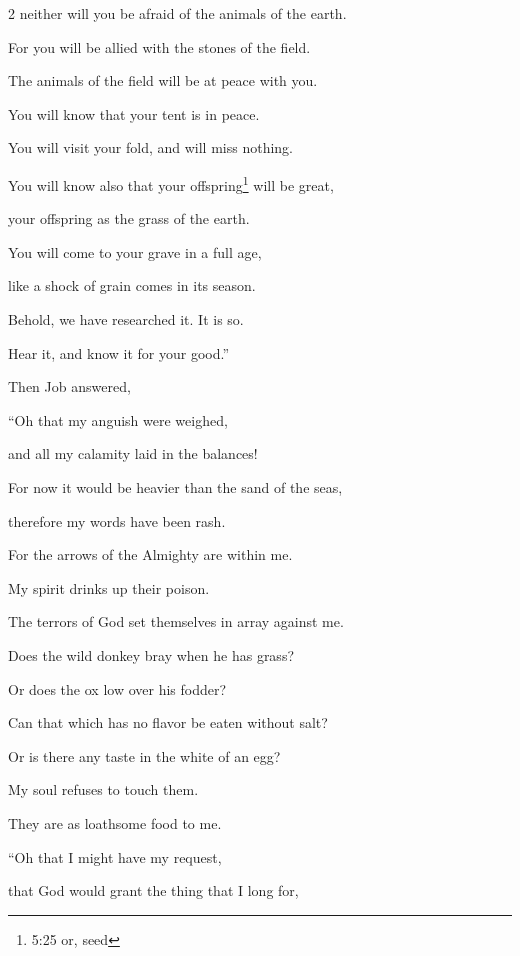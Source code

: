\begin{multicols}{2}
	neither will you be afraid of the animals of the earth.
	
	\myverse{}For you will be allied with the stones of the field.
	
	The animals of the field will be at peace with you.
	
	\myverse{}You will know that your tent is in peace.
	
	You will visit your fold, and will miss nothing.
	
	\myverse{}You will know also that your offspring\footnote{5:25 or, seed} will be great,
	
	your offspring as the grass of the earth.
	
	\myverse{}You will come to your grave in a full age,
	
	like a shock of grain comes in its season.
	
	\myverse{}Behold, we have researched it. It is so.
	
	Hear it, and know it for your good.”
	
	
	\mychapter{} \myverse*{}Then Job answered,
	
	\myverse{}“Oh that my anguish were weighed,
	
	and all my calamity laid in the balances!
	
	\myverse{}For now it would be heavier than the sand of the seas,
	
	therefore my words have been rash.
	
	\myverse{}For the arrows of the Almighty are within me.
	
	My spirit drinks up their poison.
	
	The terrors of God set themselves in array against me.
	
	\myverse{}Does the wild donkey bray when he has grass?
	
	Or does the ox low over his fodder?
	
	\myverse{}Can that which has no flavor be eaten without salt?
	
	Or is there any taste in the white of an egg?
	
	\myverse{}My soul refuses to touch them.
	
	They are as loathsome food to me.
	
	\vspace{\baselineskip}
	
	\myverse{}“Oh that I might have my request,
	
	that God would grant the thing that I long for,
	

\end{multicols}
